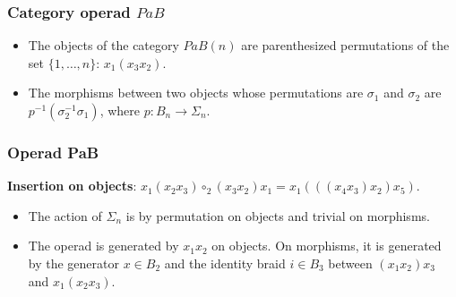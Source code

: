 \documentclass{beamer}
\theoremstyle{definition}
\begin{document}
\begin{frame}
	\frametitle{Category operad $PaB$}
\begin{itemize}
	\item<1-> The objects of the category $PaB(n)$ are parenthesized permutations of the set $\{1,\dots, n\}$: $x_1(x_3x_2)$.
	\item<2-> The morphisms between two objects whose permutations are $\sigma_1$ and $\sigma_2$ are $p^{-1}(\sigma_2^{-1}\sigma_1)$, where $p:B_n\to \Sigma_n$. %
\end{itemize}
 \end{frame}
\begin{frame}
	\frametitle{Operad PaB}
	\textbf{Insertion on objects}: $x_1(x_2x_3)\circ_2(x_3x_2)x_1=x_1(((x_4x_3)x_2)x_5)$.
	

\begin{itemize}
	\item<3-> The action of $\Sigma_n$ is by permutation on objects and trivial on morphisms.
	\item<4-> The operad is generated by $x_1x_2$ on objects. On morphisms, it is generated by the generator $x\in B_2$ and the identity braid $i\in B_3$ between $(x_1x_2)x_3$ and $x_1(x_2x_3)$.
\end{itemize}
	
	
\end{frame}
\end{document}
